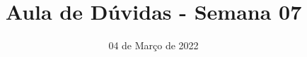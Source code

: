 \documentclass{beamer}
\title{Aula de Dúvidas - Semana 07}
\author[\autor]{\autor}
\institute[\instituto]{\instituto}
\date{04 de Março de 2022}
\begin{document}
    \begin{frame}
        \maketitle
    \end{frame}
\end{document}
